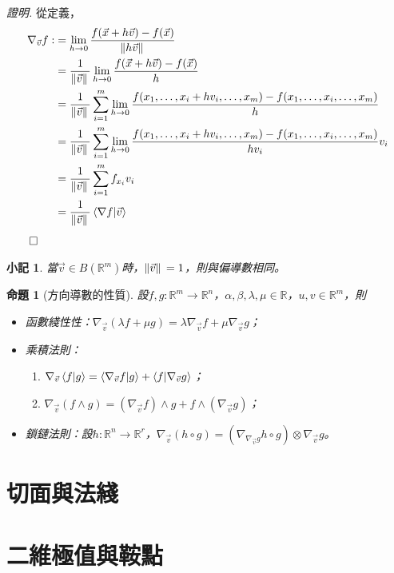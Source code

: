 \documentclass[12pt]{article}
\newtheorem*{proposition}{命題}
\newtheorem*{remark}{小記}
\renewenvironment*{proof}{\textit{證明.}}{\hfill$\qed$}
\begin{document}
    \begin{proof}
        從定義，\begin{align*}
            \nabla_{\vec{v}}f:&=\lim_{h\to 0}\frac{f(\vec{x}+h\vec{v})-f(\vec{x})}{\norm*{h\vec{v}}}\\
            &=\frac{1}{\norm*{\vec{v}}}\lim_{h\to 0}\frac{f(\vec{x}+h\vec{v})-f(\vec{x})}{h}\\
            &=\frac{1}{\norm*{\vec{v}}}\sum_{i=1}^{m}\lim_{h\to 0}\frac{f(x_1,\dots,x_i+hv_i,\dots,x_m)-f(x_1,\dots,x_i,\dots,x_m)}{h}\\
            &=\frac{1}{\norm*{\vec{v}}}\sum_{i=1}^{m}\lim_{h\to 0}\frac{f(x_1,\dots,x_i+hv_i,\dots,x_m)-f(x_1,\dots,x_i,\dots,x_m)}{hv_i}v_i\\
            &=\frac{1}{\norm*{\vec{v}}}\sum_{i=1}^{m}f_{x_i}v_i\\
            &=\frac{1}{\norm*{\vec{v}}}\innerproduct{\nabla f}{\vec{v}}\\
        \end{align*}
    \end{proof}

    \begin{remark}
        當$\vec{v}\in B(\mathbb{R}^m)$時，$\norm*{\vec{v}}=1$，則與偏導數相同。
    \end{remark}

    \begin{proposition}[方向導數的性質]
        設$f,g:\mathbb{R}^m\to\mathbb{R}^n$，$\alpha,\beta,\lambda,\mu\in\mathbb{R}$，$u,v\in\mathbb{R}^m$，則\begin{itemize}
            \item 函數綫性性：$\nabla_{\vec{v}}(\lambda f+\mu g)=\lambda\nabla_{\vec{v}}f+\mu\nabla_{\vec{v}}g$；
            \item 乘積法則：\begin{enumerate}
                \item $\nabla_{\vec{v}}\innerproduct{f}{g}=\innerproduct{\nabla_{\vec{v}}f}{g} +\innerproduct{f}{\nabla_{\vec{v}}g}$；
                \item $\nabla_{\vec{v}}(f\wedge g)=(\nabla_{\vec{v}}f)\wedge g +f\wedge (\nabla_{\vec{v}}g)$；
            \end{enumerate}
            \item 鎖鏈法則：設$h:\mathbb{R}^n\to\mathbb{R}^r$，$\nabla_{\vec{v}}(h\circ g)=(\nabla_{\nabla_{\vec{v}}g}h\circ g)\otimes \nabla_{\vec{v}}g$。
        \end{itemize}
    \end{proposition}

    \section*{切面與法綫}

    \section*{二維極值與鞍點}
\end{document}
